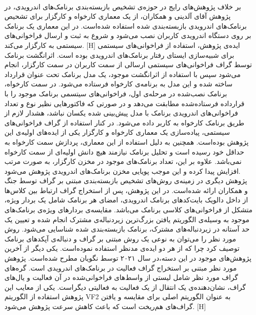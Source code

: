 \\
بر خلاف پژوهش‌های رایج در حوزه‌ی تشخیص بازبسته‌بندی برنامک‌های اندرویدی، در پژوهش آقای آلدینی و همکاران، از یک معماری کارخواه و کارگزار برای تشحیص برنامک‌های اندرویدی بازبسته‌بندی شده استفاده شده‌است. در این معماری یک برنامک بر روی دستگاه اندرویدی کاربران نصب می‌شود و شروع به ثبت و ارسال فراخوانی‌های سیستمی به کارگزار می‌کند. 
[H]
\vspace{1em}
ایده‌ی پژوهش، استفاده از فراخوانی‌های سیستمی برای شبیه‌سازی ایستا‌ی رفتار برنامک‌های اندرویدی بوده است. اثرانگشت برنامک توسط گراف فراخوانی‌های سیستمی ارسالی از سمت کاربران در سمت کارگزار، انجام می‌شود سپس با استفاده از اثرانگشت موجود، یک مدل برنامک تحت عنوان قرارداد ساخته شده و این مدل به برنامه‌ی کارخواه فرستاده می‌شود. در سمت کارخواه، برنامک نصب‌شده در مرحله‌ی اول، فراخوانی‌های سیتسمی برنامک موجود را با قرارداده فرستاده‌شده مطابقت می‌دهد و در صورتی که فاکتور‌هایی نظیر نوع و تعداد فراخوانی‌های اندرویدی برنامک با مدل پیش‌بینی شده یکسان نباشد، هشدار لازم از طریق برنامک کارخواه به کاربر داده می‌شود. در کنار استفاده از گراف فراخوانی‌‌های سیستمی، پیاده‌سازی یک معماری کارخواه و کارگزار یکی از ایده‌های اولیه‌ی این پژوهش بوده‌است. همچنین به دلیل استفاده از این معماری، پردازش سمت کارخواه به حداقل خود رسیده است و تحلیل برنامک نیازمند هیچ دانش اولیه‌ای از سمت کارخواه نمی‌باشد. علاوه بر این، تعداد برنامک‌های موجود در مخزن کارگزار، به صورت مرتب افزایش پیدا کرده و این موجب پویایی مخزن برنامک‌های اندرویدی پژوهش می‌شود. \\
پژوهش دیگری در زمینه‌ی روش‌های تشخیص بازبسته‌بندی مبتنی بر گراف توسط جنگ و همکاران ارائه شده‌است. در این پژوهش، پس از استخراج گراف ارتباط بین کلاس‌ها از داخل دالویک بایت‌کد‌های برنامک اندرویدی، امضای هر برنامک شامل یک بردار ویژه، متشکل از فراخوانی‌‌های کلاسی برنامک می‌باشد. مقایسه‌ی بردار‌های ویژه‌ی برنامک‌های موجود به وسیله‌ی الگوریتم یافتن بزر‌گ‌ترین زیر‌دنباله‌ی مشترک انجام شده و تعیین یک حد آستانه در زیر‌دنباله‌های مشترک، برنامک‌ بازبسته‌بندی شده شناسایی می‌شود. روش مورد نظر را می‌توان به نوعی یک روش مبتنی بر گراف و دنباله‌ی آپکد‌های برنامک توصیف کرد چرا که از هر دو ایده‌ی مدنظر استفاده نموده‌است. یکی دیگر از آخرین پژوهش‌های موجود در این دسته،‌در سال ۲۰۲۱ توسط نگویان مطرح شده‌است. پژوهش مورد نظر مبتنی بر استخراج گراف فعالیت‌ در برنامک‌های اندرویدی است. گره‌های گراف مورد نظر شامل لیستی از واسط‌های فراخوانی‌شده در آن فعالیت و یال‌های گراف، نشان‌دهنده‌ی یک انتقال از یک فعالیت به فعالیتی دیگر‌است. یکی از معایب این پژوهش استفاده از الگوریتم VF2 به عنوان الگوریتم اصلی برای مقایسه‌ و یافتن گراف‌های هم‌ریخت است که باعث کاهش سرعت پژوهش می‌شود. 
[H]
\vspace{1em}

